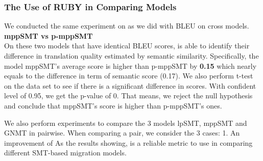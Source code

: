 \subsubsection{The Use of RUBY in Comparing Models}
We conducted the same experiment on {\model} as we did with BLEU on cross models. 
\textbf{mppSMT vs p-mppSMT}\\
On these two models that have identical BLEU scores, {\model} is able to identify their difference in translation quality estimated by semantic similarity. Specifically, the model mppSMT's average {\model} score is higher than p-mppSMT by \textbf{0.15} which nearly equals to the difference in term of semantic score (0.17). We also perform t-test on the data set to see if there is a significant difference in {\model} scores. With confident level of 0.95, we get the p-value of 0. That means, we reject the null hypothesis and conclude that mppSMT's {\model} score is higher than p-mppSMT's ones.

We also perform experiments to compare the 3 models lpSMT, mppSMT and GNMT in pairwise. When comparing a pair, we consider the 3 cases: 1. An improvement of 
As the results showing, {\model} is a reliable metric to use in comparing different SMT-based migration models. 	
